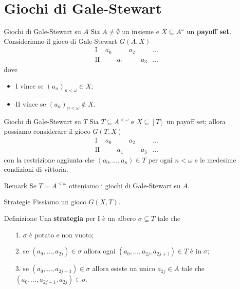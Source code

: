\documentclass[aspectratio=43]{beamer}
\begin{document}
\section{Giochi di Gale-Stewart}

\begin{frame}{Giochi di Gale-Stewart su \(A\)}
  Sia \(A \neq \emptyset\) un insieme e \(X \subseteq A^\omega\) un \textbf{payoff set}.
  Consideriamo il gioco di Gale-Stewart \(G(A, X)\)
  \begin{equation*}
    \begin{matrix}
      \mathrm{I} & a_0 & & a_2 & & \ldots\\
      \mathrm{II} & & a_1 & & a_3 & \ldots
    \end{matrix}
  \end{equation*}
  \pause
  dove
  \begin{itemize}
  \item \(\mathrm{I}\) vince se \((a_n)_{n < \omega} \in X\);
  \item \(\mathrm{II}\) vince se \((a_n)_{n < \omega} \not\in X\).
  \end{itemize}
\end{frame}

\begin{frame}{Giochi di Gale-Stewart su \(T\)}
  Sia \(T \subseteq A^{<\omega}\) e \(X\subseteq [T]\) un payoff set; allora possiamo considerare il gioco \(G(T, X)\)
  \begin{equation*}
    \begin{matrix}
      \mathrm{I} & a_0 & & a_2 & & \ldots\\
      \mathrm{II} & & a_1 & & a_3 & \ldots
    \end{matrix}
  \end{equation*}
  con la restrizione aggiunta che \((a_0, \ldots, a_n) \in T\) per ogni \(n < \omega\) e le medesime condizioni di vittoria.
  \pause
  \begin{block}{Remark}
    Se \(T = A^{<\omega}\) otteniamo i giochi di Gale-Stewart su \(A\).
  \end{block}
\end{frame}

\begin{frame}{Strategie}
  Fissiamo un gioco \(G(X, T)\).
  \begin{block}{Definizione}
     Una \textbf{strategia} per \(\mathrm{I}\) è un albero \(\sigma \subseteq T\) tale che
    \begin{itemize}
    \item[1.] \(\sigma\) è potato e non vuoto;
    \item[2.] se \((a_0, \ldots, a_{2j}) \in \sigma\) allora ogni \((a_0, \ldots, a_{2j}, a_{2j+1}) \in T\) è in \(\sigma\);
    \item[3.] se \((a_0, \ldots, a_{2j - 1}) \in \sigma\) allora esiste un unico \(a_{2j} \in A\) tale che \((a_0, \ldots, a_{2j - 1}, a_{2j}) \in \sigma\).
    \end{itemize}
  \end{block}
\end{frame}
\end{document}
